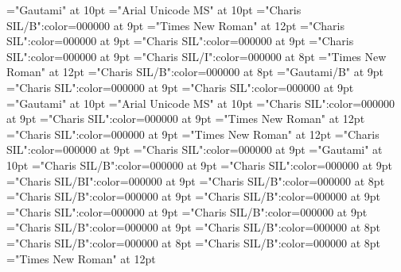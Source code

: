\documentclass[gps1,twoside]{article}
\begin{document}
 
\pagestyle{plain} 
\sloppy 
\setlength{\parfillskip}{0pt plus 1fil} 
\font\xitemte="Gautami" at 10pt
\font\xitemhi="Arial Unicode MS" at 10pt
\font\xitemxitemcomplexformformbefore="Charis SIL/B":color=000000 at 9pt
\font\xitemxitemcomplexformrefsbefore="Times New Roman" at 12pt
\font\xitemxitemdefinitionbefore="Charis SIL":color=000000 at 9pt
\font\xitemxitementryrefcomponentbefore="Charis SIL":color=000000 at 9pt
\font\xitemxitementryreftypebefore="Charis SIL":color=000000 at 9pt
\font\xitemxitemexamplebefore="Charis SIL/I":color=000000 at 8pt
\font\xitemxitemexamplesbefore="Times New Roman" at 12pt
\font\xitemxitemheadwordbefore="Charis SIL/B":color=000000 at 8pt
\font\xitemxitemLexEntrypublishStemComponentTargetHeadWordRefbefore="Gautami/B" at 9pt
\font\xitemxitemLexEntryTypepublishStemComplexFormTypeReverseAbbrPubbefore="Charis SIL":color=000000 at 9pt
\font\xitemxitemLexEntryTypepublishStemEntryTypeAbbreviationPubbefore="Charis SIL":color=000000 at 9pt
\font\xitemxitemLexSensepublishStemGlossPubLdbefore="Gautami" at 10pt
\font\xitemxitemLexSensepublishStemGlossPubLebefore="Arial Unicode MS" at 10pt
\font\xitemxitempartofspeechbefore="Charis SIL":color=000000 at 9pt
\font\xitemxitempictureLabelbefore="Charis SIL":color=000000 at 9pt
\font\xitemxitemprimaryrefsbefore="Times New Roman" at 12pt
\font\xitemxitempronunciationbefore="Charis SIL":color=000000 at 9pt
\font\xitemxitempronunciationsbefore="Times New Roman" at 12pt
\font\sensesensesensesbefore="Charis SIL":color=000000 at 9pt
\font\xitemxitemtranslationbefore="Charis SIL":color=000000 at 9pt
\font\xitemxitemtranslationLdbefore="Gautami" at 10pt
\font\xitemxitemcrossrefbefore="Charis SIL/B":color=000000 at 9pt
\font\xitemxitemcrossreftargetsbefore="Charis SIL":color=000000 at 9pt
\font\xitemxitemcrossreftypebefore="Charis SIL/BI":color=000000 at 9pt
\font\xitemxitemheadwordminorbefore="Charis SIL/B":color=000000 at 8pt
\font\xitemxitemmainentryrefbefore="Charis SIL/B":color=000000 at 9pt
\font\xitemxitemmainentryrefminorbefore="Charis SIL/B":color=000000 at 9pt
\font\xitemxitempronunciationminorbefore="Charis SIL":color=000000 at 9pt
\font\xitemxitemsensecrossrefbefore="Charis SIL/B":color=000000 at 9pt
\font\xitemxitemsensemainentryrefbefore="Charis SIL/B":color=000000 at 9pt
\font\xitemxitemheadwordsubbefore="Charis SIL/B":color=000000 at 8pt
\font\xitemxitemLexEntrypublishRootMinorPrimaryTargetMLHeadWordPubbefore="Charis SIL/B":color=000000 at 8pt
\font\xitemxitemLexEntrypublishStemMinorPrimaryTargetMLHeadWordPubbefore="Charis SIL/B":color=000000 at 8pt
\font\xitemtpi="Times New Roman" at 12pt
\end{document}
